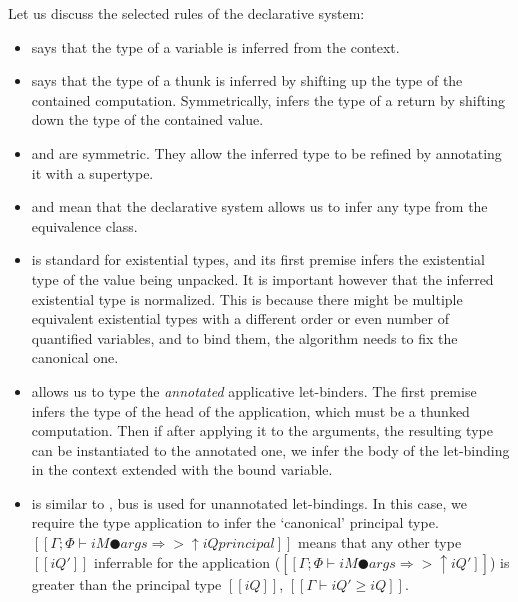\documentclass[acmsmall,natbib=false,review,anonymous]{acmart}
\begin{document}
Let us discuss the selected rules of the declarative system:
\begin{itemize}
  \item {}
    says that the type of a variable is inferred from the context.
  \item {} says
    that the type of a thunk is inferred by shifting up the type of the 
    contained computation. Symmetrically, 
    infers the type of a return by shifting down the type of the
    contained value.
  \item {} and  are symmetric.
    They allow the inferred type to be refined by annotating it with a supertype.
  \item {} and 
    mean that the declarative system allows us to infer any type from the equivalence class.
  \item {} is standard for existential types,
    and its first premise infers the existential type of the value being unpacked.
    It is important however that the inferred existential type is normalized. 
    This is because there might be multiple equivalent existential types 
    with a different order or even number of quantified variables, 
    and to bind them, the algorithm needs to fix the canonical one.
  \item {} allows us to
    type the \emph{annotated} applicative let-binders. 
    The first premise infers the type of the head of the application,
    which must be a thunked computation. Then if after applying it 
    to the arguments, the resulting type can be instantiated to the annotated one,
    we infer the body of the let-binding in the context extended with the bound variable.
  \item {} is similar to ,
    bus is used for unannotated let-bindings. In this case, 
    we require the type application to infer the `canonical' principal type.
    $[[Γ ; Φ ⊢ iM ● args ⇒> ↑iQ principal]]$ means that
    any other type $[[iQ']]$ inferrable for the application (\ie $[[Γ ; Φ ⊢ iM ● args ⇒> ↑iQ']]$)
    is greater than the principal type $[[iQ]]$, \ie $[[Γ ⊢ iQ' ≥ iQ]]$.
\end{itemize}
\end{document}
